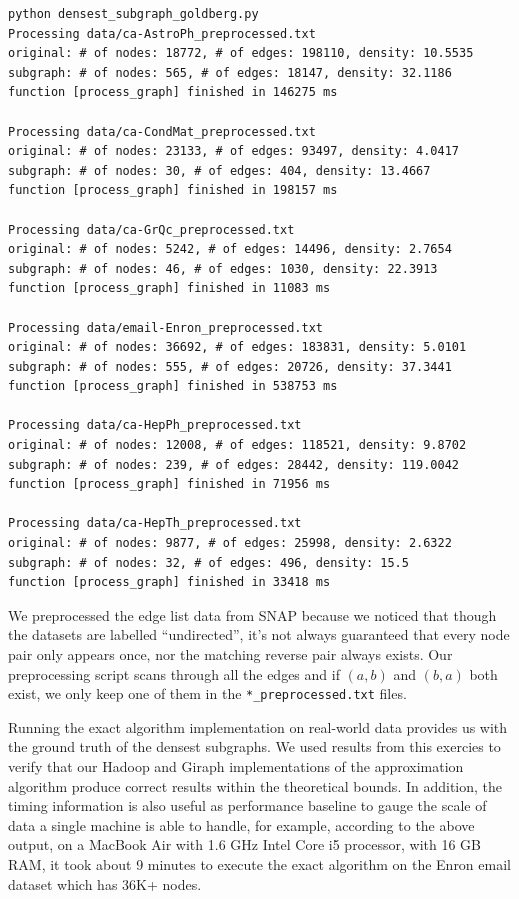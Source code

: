 \documentclass{article}
\begin{document}
\footnotesize
\begin{lstlisting}[mathescape=true]
python densest_subgraph_goldberg.py
Processing data/ca-AstroPh_preprocessed.txt
original: # of nodes: 18772, # of edges: 198110, density: 10.5535
subgraph: # of nodes: 565, # of edges: 18147, density: 32.1186
function [process_graph] finished in 146275 ms

Processing data/ca-CondMat_preprocessed.txt
original: # of nodes: 23133, # of edges: 93497, density: 4.0417
subgraph: # of nodes: 30, # of edges: 404, density: 13.4667
function [process_graph] finished in 198157 ms

Processing data/ca-GrQc_preprocessed.txt
original: # of nodes: 5242, # of edges: 14496, density: 2.7654
subgraph: # of nodes: 46, # of edges: 1030, density: 22.3913
function [process_graph] finished in 11083 ms

Processing data/email-Enron_preprocessed.txt
original: # of nodes: 36692, # of edges: 183831, density: 5.0101
subgraph: # of nodes: 555, # of edges: 20726, density: 37.3441
function [process_graph] finished in 538753 ms

Processing data/ca-HepPh_preprocessed.txt
original: # of nodes: 12008, # of edges: 118521, density: 9.8702
subgraph: # of nodes: 239, # of edges: 28442, density: 119.0042
function [process_graph] finished in 71956 ms

Processing data/ca-HepTh_preprocessed.txt
original: # of nodes: 9877, # of edges: 25998, density: 2.6322
subgraph: # of nodes: 32, # of edges: 496, density: 15.5
function [process_graph] finished in 33418 ms
\end{lstlisting}

\normalsize

We preprocessed the edge list data from SNAP because we noticed that though the datasets are labelled ``undirected'', it's not always guaranteed that every node pair only appears once, nor the matching reverse pair always exists. Our preprocessing script scans through all the edges and if $(a, b)$ and $(b, a)$ both exist, we only keep one of them in the \texttt{*\_preprocessed.txt} files.

Running the exact algorithm implementation on real-world data provides us with the ground truth of the densest subgraphs. We used results from this exercies to verify that our Hadoop and Giraph implementations of the approximation algorithm produce correct results within the theoretical bounds. In addition, the timing information is also useful as performance baseline to gauge the scale of data a single machine is able to handle, for example, according to the above output, on a MacBook Air with 1.6 GHz Intel Core i5 processor, with 16 GB RAM, it took about 9 minutes to execute the exact algorithm on the Enron email dataset which has 36K+ nodes.
\end{document}
